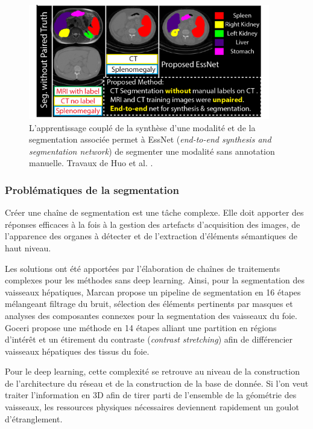       \begin{figure}[!ht]
        \centering
        \includegraphics[height=5cm]{Images/ESSNET_application.png}
        \caption{L'apprentissage couplé de la synthèse d'une modalité et de la segmentation associée permet à EssNet (\textit{end-to-end synthesis and segmentation network}) de segmenter une modalité sans annotation manuelle. Travaux de Huo et al. \cite{Huo2018_adversarial}. }
        \label{fig:ESSNet}
      \end{figure}

    \subsubsection{Problématiques de la segmentation}

    Créer une chaîne de segmentation est une tâche complexe. Elle doit apporter des réponses efficaces à la fois à la gestion des artefacts d'acquisition des images, de l'apparence des organes à détecter et de l'extraction d'éléments sémantiques de haut niveau. 

    Les solutions ont été apportées par l'élaboration de chaînes de traitements complexes pour les méthodes sans deep learning. Ainsi, pour la segmentation des vaisseaux hépatiques, Marcan \cite{Marcan2014_vessel_seg} propose un pipeline de segmentation en 16 étapes mélangeant filtrage du bruit, sélection des éléments pertinents par masques et analyses des composantes connexes pour la segmentation des vaisseaux du foie. Goceri \cite{Goceri2017_vessel} propose une méthode en 14 étapes alliant une partition en régions d'intérêt et un étirement du contraste (\textit{contrast stretching}) afin de différencier vaisseaux hépatiques des tissus du foie.
  
    Pour le deep learning, cette complexité se retrouve au niveau de la construction de l'architecture du réseau et de la construction de la base de donnée. Si l'on veut traiter l'information en 3D afin de tirer parti de l'ensemble de la géométrie des vaisseaux, les ressources physiques nécessaires deviennent rapidement un goulot d'étranglement.  
    
